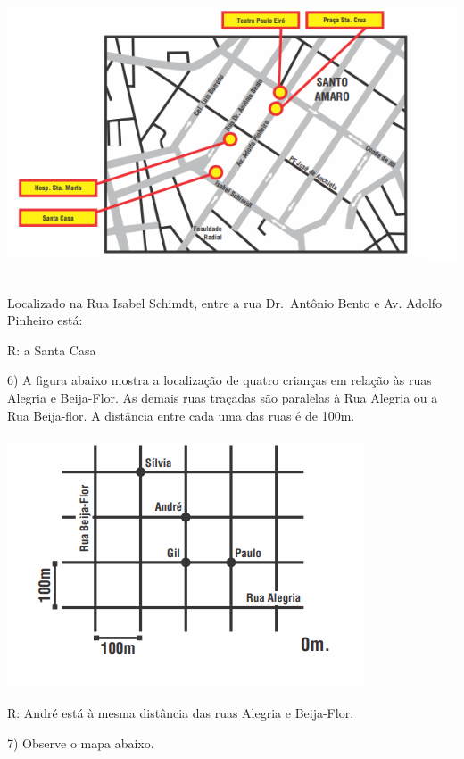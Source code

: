 \includegraphics[width=5.90625in,height=3.34375in]{./imgSAEB_6_MAT/media/image68.png}

Localizado na Rua Isabel Schimdt, entre a rua Dr.~Antônio Bento e Av.
Adolfo Pinheiro está:

R: a Santa Casa

6) A figura abaixo mostra a localização de quatro crianças em relação às
ruas Alegria e Beija-Flor. As demais ruas traçadas são paralelas à Rua
Alegria ou a Rua Beija-flor. A distância entre cada uma das ruas é de
100m.

\includegraphics[width=4.19792in,height=2.93056in]{./imgSAEB_6_MAT/media/image69.png}

R: André está à mesma distância das ruas Alegria e Beija-Flor.

7) Observe o mapa abaixo.

